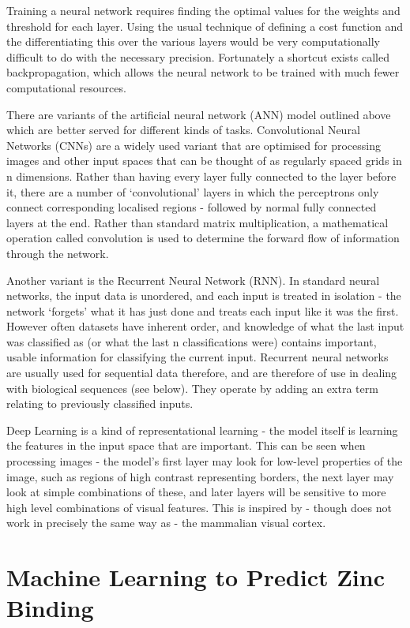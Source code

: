 Training a neural network requires finding the optimal values for the weights and threshold for each layer. Using the usual technique of defining a cost function and the differentiating this over the various layers would be very computationally difficult to do with the necessary precision. Fortunately a shortcut exists called backpropagation, which allows the neural network to be trained with much fewer computational resources.

There are variants of the artificial neural network (ANN) model outlined above which are better served for different kinds of tasks. Convolutional Neural Networks (CNNs) are a widely used variant that are optimised for processing images and other input spaces that can be thought of as regularly spaced grids in n dimensions. Rather than having every layer fully connected to the layer before it, there are a number of `convolutional' layers in which the perceptrons only connect corresponding localised regions - followed by normal fully connected layers at the end. Rather than standard matrix multiplication, a mathematical operation called convolution is used to determine the forward flow of information through the network.

Another variant is the Recurrent Neural Network (RNN). In standard neural networks, the input data is unordered, and each input is treated in isolation - the network `forgets' what it has just done and treats each input like it was the first. However often datasets have inherent order, and knowledge of what the last input was classified as (or what the last n classifications were) contains important, usable information for classifying the current input. Recurrent neural networks are usually used for sequential data therefore, and are therefore of use in dealing with biological sequences (see below). They operate by adding an extra term relating to previously classified inputs. 

Deep Learning is a kind of representational learning - the model itself is learning the features in the input space that are important. This can be seen when processing images - the model's first layer may look for low-level properties of the image, such as regions of high contrast representing borders, the next layer may look at simple combinations of these, and later layers will be sensitive to more high level combinations of visual features. This is inspired by - though does not work in precisely the same way as - the mammalian visual cortex.


\section{Machine Learning to Predict Zinc Binding}

